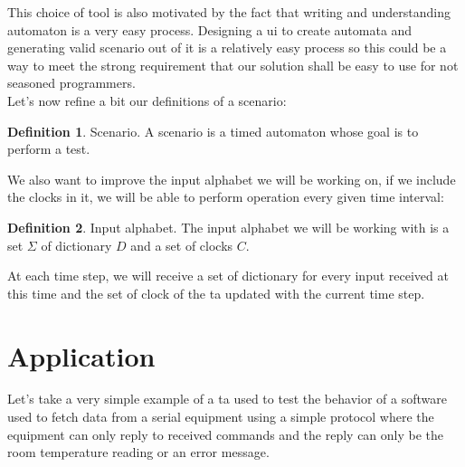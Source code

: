 \documentclass[12pt]{article}
\theoremstyle{definition}
\newtheorem{definition}{Definition}[section]
\theoremstyle{definition}
\theoremstyle{remark}
\begin{document}
This choice of tool is also motivated by the fact that writing and understanding automaton is a very easy process. Designing a \gls{ui} to create automata and generating valid scenario out of it is a relatively easy process so this could be a way to meet the strong requirement that our solution shall be easy to use for not seasoned programmers.\\

Let's now refine a bit our definitions of a scenario:
\theoremstyle{definition}
\begin{definition}{Scenario.} A scenario is a timed automaton whose goal is to perform a test.
\end{definition}

We also want to improve the input alphabet we will be working on, if we include the clocks in it, we will be able to perform operation every given time interval:
\theoremstyle{definition}
\begin{definition}{Input alphabet.} The input alphabet we will be working with is a set $\Sigma$ of dictionary $D$ and a set of clocks $C$.
\end{definition}

At each time step, we will receive a set of dictionary for every input received at this time and the set of clock of the \gls{ta} updated with the current time step.



\section{Application}
\label{secApplication}


Let's take a very simple example of a \gls{ta} used to test the behavior of a software used to fetch data from a serial equipment using a simple protocol where the equipment can only reply to received commands and the reply can only be the room temperature reading or an error message.
\end{document}
